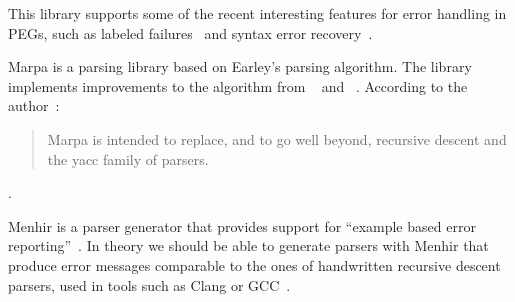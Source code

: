 \begin{description}[style=multiline, leftmargin=3cm, font=\bfseries]
  \item[LPegLabel (Lua)] This library supports some of the recent interesting features for error handling in \glspl{PEG}, such as labeled failures~\cite{maidl2016labeled} and syntax error recovery~\cite{medeiros2018recovery}.

  \item[Marpa (Perl)] Marpa is a parsing library based on Earley’s parsing algorithm. The library implements improvements to the algorithm from \citeauthor{leo1991general}~\cite{leo1991general} and \citeauthor{aycock2002practical}~\cite{aycock2002practical}. According to the author~\cite{kegler2019marpa}:

  \begin{quote}
    Marpa is intended to replace, and to go well beyond, recursive descent and the yacc family of parsers.
  \end{quote}

  .

  \item [Menhir (OCaml)] Menhir is a  parser generator that provides support for “example based error reporting”~\cite{jeffery2003generating, kaestner2018compcert, pottier2019menhir}. In theory we should be able to generate parsers with Menhir that produce error messages comparable to the ones of handwritten recursive descent parsers, used in tools such as Clang or GCC~\cite[p. 2]{kaestner2018compcert}.
\end{description}
